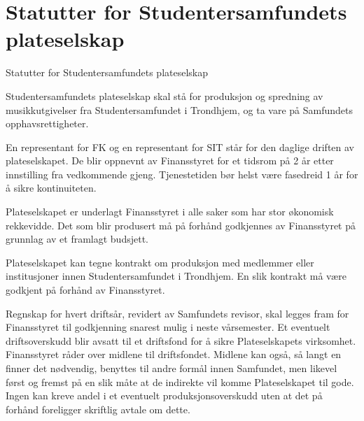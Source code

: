 \documentclass[fsbok.tex]{subfiles}
\begin{document}
\chapter{Statutter for Studentersamfundets plateselskap}

\begin{lovkapittel}{Statutter for Studentersamfundets plateselskap}
  
  \begin{lovparagraf}
    Studentersamfundets plateselskap skal stå for produksjon og spredning av musikkutgivelser fra Studentersamfundet i 
    Trondhjem, og ta vare på Samfundets opphavsrettigheter.
  \end{lovparagraf}
  
  \begin{lovparagraf} 
    En representant for FK og en representant for SIT står for den daglige driften av plateselskapet. De blir oppnevnt av
    Finansstyret for et tidsrom på 2 år etter innstilling fra vedkommende gjeng. Tjenestetiden bør helst være fasedreid 1 år
    for å sikre kontinuiteten.
  \end{lovparagraf}
  
  \begin{lovparagraf}
    Plateselskapet er underlagt Finansstyret i alle saker som har stor økonomisk rekkevidde. Det som blir produsert må på
    forhånd godkjennes av Finansstyret på grunnlag av et framlagt budsjett.
  \end{lovparagraf}
  
  \begin{lovparagraf}
    Plateselskapet kan tegne kontrakt om produksjon med medlemmer eller institusjoner innen Studentersamfundet i
    Trondhjem. En slik kontrakt må være godkjent på forhånd av Finansstyret.
  \end{lovparagraf}

  \begin{lovparagraf}
    Regnskap for hvert driftsår, revidert av Samfundets revisor, skal legges fram for Finansstyret til godkjenning snarest
    mulig i neste vårsemester. Et eventuelt driftsoverskudd blir avsatt til et driftsfond for å sikre Plateselskapets
    virksomhet. Finansstyret råder over midlene til driftsfondet. Midlene kan også, så langt en finner det nødvendig,
    benyttes til andre formål innen Samfundet, men likevel først og fremst på en slik måte at de indirekte vil komme
    Plateselskapet til gode. Ingen kan kreve andel i et eventuelt produksjonsoverskudd uten at det på forhånd foreligger
    skriftlig avtale om dette.
  \end{lovparagraf}

\end{lovkapittel} 
\end{document}
